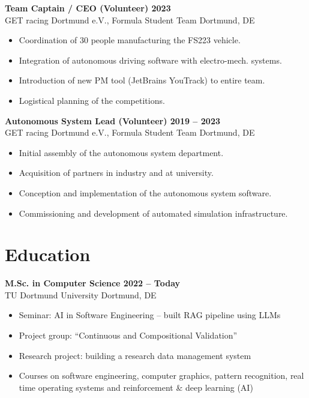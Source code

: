 \documentclass[a4paper,11pt]{article}
\newcommand{\subsectionskip}[0]{\vspace{0.125cm}}
\newcommand{\col}[2]{\textcolor[HTML]{#1}{#2}}
\begin{document}
\begin{minipage}[t]{0.65\textwidth}
    \subsectionskip

    \col{ab8064}{\textbf{Team Captain / CEO (Volunteer) \hfill 2023}} \\
    GET racing Dortmund e.V., Formula Student Team \hfill Dortmund, DE
    \begin{itemize}
        \small
        \item Coordination of 30 people manufacturing the FS223 vehicle.
        \item Integration of autonomous driving software with electro-mech. systems.
        \item Introduction of new PM tool (JetBrains YouTrack) to entire team.
        \item Logistical planning of the competitions.
    \end{itemize}

    \subsectionskip

    \col{9c7d6c}{\textbf{Autonomous System Lead (Volunteer) \hfill 2019 -- 2023}} \\
    GET racing Dortmund e.V., Formula Student Team \hfill Dortmund, DE
    \begin{itemize}
        \small
        \item Initial assembly of the autonomous system department.
        \item Acquisition of partners in industry and at university.
        \item Conception and implementation of the autonomous system software.
        \item Commissioning and development of automated simulation infrastructure.
    \end{itemize}

    \section*{\col{7e7576}{Education}}
    \col{7f7679}{\textbf{M.Sc. in Computer Science \hfill 2022 -- Today}} \\
    TU Dortmund University \hfill Dortmund, DE
    \begin{itemize}
        \small
        \item Seminar: AI in Software Engineering -- built RAG pipeline using LLMs
        \item Project group: \enquote{Continuous and Compositional Validation}
        \item Research project: building a research data management system
        \item Courses on software engineering, computer graphics, pattern recognition, real time operating systems and reinforcement \& deep learning (AI)
    \end{itemize}


\end{minipage}
\end{document}
